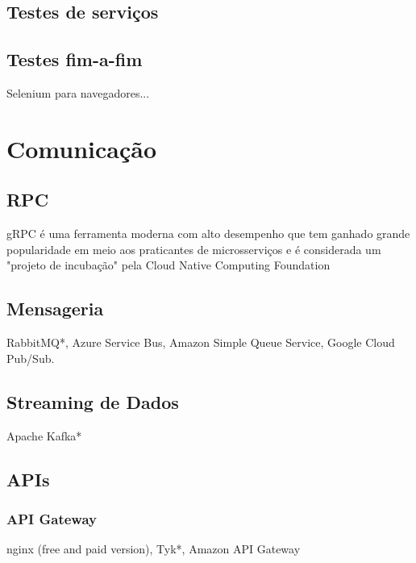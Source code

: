 \subsection{Testes de serviços}

\subsection{Testes fim-a-fim}
Selenium para navegadores...


\section{Comunicação}

\subsection{RPC}
gRPC é uma ferramenta moderna com alto desempenho que tem ganhado grande popularidade em meio aos praticantes de microsserviços e é considerada um "projeto de incubação" pela Cloud Native Computing Foundation \cite{grpc}


\subsection{Mensageria}
RabbitMQ*, Azure Service Bus, Amazon Simple Queue Service, Google Cloud Pub/Sub.

\subsection{Streaming de Dados}
Apache Kafka*

\subsection{APIs}

\subsubsection{API Gateway}
nginx (free and paid version), Tyk*, Amazon API Gateway

